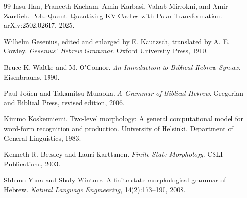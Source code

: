 \documentclass[11pt]{article}
\theoremstyle{definition}
\theoremstyle{plain}
\theoremstyle{remark}
\numberwithin{equation}{section}
\begin{document}
\begin{thebibliography}{99}
Insu Han, Praneeth Kacham, Amin Karbasi, Vahab Mirrokni, and Amir Zandieh.
\newblock PolarQuant: Quantizing KV Caches with Polar Transformation.
\newblock arXiv:2502.02617, 2025.

Wilhelm Gesenius, edited and enlarged by E. Kautzsch, translated by A. E. Cowley.
\newblock \emph{Gesenius' Hebrew Grammar}.
\newblock Oxford University Press, 1910.

Bruce K. Waltke and M. O'Connor.
\newblock \emph{An Introduction to Biblical Hebrew Syntax}.
\newblock Eisenbrauns, 1990.

Paul Joüon and Takamitsu Muraoka.
\newblock \emph{A Grammar of Biblical Hebrew}.
\newblock Gregorian and Biblical Press, revised edition, 2006.

Kimmo Koskenniemi.
\newblock Two-level morphology: A general computational model for word-form recognition and production.
\newblock University of Helsinki, Department of General Linguistics, 1983.

Kenneth R. Beesley and Lauri Karttunen.
\newblock \emph{Finite State Morphology}.
\newblock CSLI Publications, 2003.

Shlomo Yona and Shuly Wintner.
\newblock A finite-state morphological grammar of Hebrew.
\newblock \emph{Natural Language Engineering}, 14(2):173--190, 2008.

\end{thebibliography}
\end{document}
